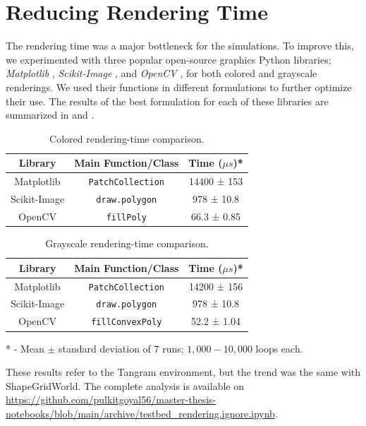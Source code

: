 \section{Reducing Rendering Time}
\label{sec:improving-render}
The rendering time was a major bottleneck for the simulations.
To improve this, we experimented with three popular open-source graphics Python libraries; \emph{Matplotlib} \citep{matplotlib}, \emph{Scikit-Image} \citep{skimage}, and \emph{OpenCV} \citep{opencv}, for both colored and grayscale renderings.
We used their functions in different formulations to further optimize their use.
The results of the best formulation for each of these libraries are summarized in  and .\\

\begin{table}[H]
    \centering
    \begin{tabular}[t]{@{} c c c @{}}
        \hline
        \textbf{Library} & \textbf{Main Function/Class} & \textbf{Time (\(\mu s\))*}\\
        \hline
        Matplotlib & \texttt{PatchCollection} & 14400 ± 153\\
        Scikit-Image & \texttt{draw.polygon} & 978 ± 10.8\\
        OpenCV & \texttt{fillPoly} & 66.3 ± 0.85\\
        \hline
    \end{tabular}
    \caption{Colored rendering-time comparison.}
    \label{tab:render-time-color}
\end{table}
\begin{table}[H]
    \centering
    \begin{tabular}[t]{@{} c c c @{}}
        \hline
        \textbf{Library} & \textbf{Main Function/Class} & \textbf{Time (\(\mu s\))*}\\
        \hline
        Matplotlib & \texttt{PatchCollection} & 14200 ± 156\\
        Scikit-Image & \texttt{draw.polygon} & 978 ± 10.8\\
        OpenCV & \texttt{fillConvexPoly} & 52.2 ± 1.04\\
        \hline
    \end{tabular}
    \caption{Grayscale rendering-time comparison.}
    \label{tab:render-time-bw}
\end{table}
* - Mean \(\pm\) standard deviation of \(7\) runs; \(1,000 - 10,000\) loops each.

These results refer to the Tangram environment, but the trend was the same with ShapeGridWorld.
The complete analysis is available on \url{https://github.com/pulkitgoyal56/master-thesis-notebooks/blob/main/archive/testbed_rendering.ignore.ipynb}.

